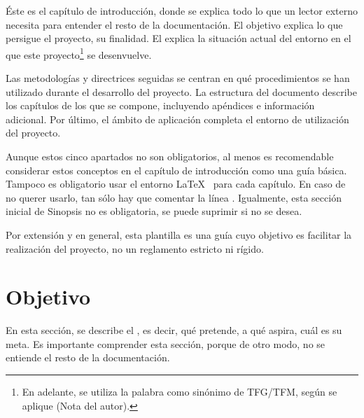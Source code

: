 
\minitoc

\begin{sinopsis}
\label{sec:intro:sinop}

Éste es el capítulo de introducción, donde se explica todo lo que un lector externo necesita para entender el resto de la documentación. El objetivo explica lo que persigue el proyecto, su finalidad.	El  explica la situación actual del entorno en el que este proyecto\footnote{En adelante, se utiliza la palabra  como sinónimo de TFG/TFM, según se aplique (Nota del autor).} se desenvuelve.

Las metodologías y directrices seguidas se centran en qué procedimientos se han utilizado durante el desarrollo del proyecto. La estructura del documento describe los capítulos de los que se compone, incluyendo apéndices e información adicional. Por último, el ámbito de aplicación completa el entorno de utilización del proyecto.

Aunque estos cinco apartados no son obligatorios, al menos es recomendable considerar estos conceptos en el capítulo de introducción como una guía básica. Tampoco es obligatorio usar el entorno \LaTeX\  para cada capítulo. En caso de no querer usarlo, tan sólo hay que comentar la línea . Igualmente, esta sección inicial de Sinopsis no es obligatoria, se puede suprimir si no se desea.

Por extensión y en general, esta plantilla es una guía cuyo objetivo es facilitar la realización del proyecto, no un reglamento estricto ni rígido.
\end{sinopsis}

\section{Objetivo}
\label{sec:intro:obj}
En esta sección, se describe el , es decir, qué pretende, a qué aspira, cuál es su meta. Es importante comprender esta sección, porque de otro modo, no se entiende el resto de la documentación.

